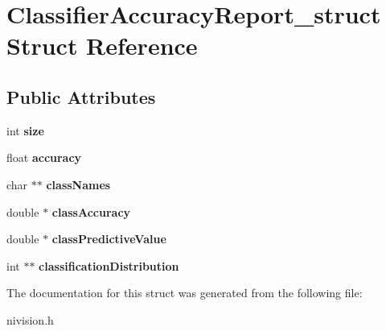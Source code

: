\hypertarget{structClassifierAccuracyReport__struct}{\section{\-Classifier\-Accuracy\-Report\-\_\-struct \-Struct \-Reference}
\label{structClassifierAccuracyReport__struct}
}
\subsection*{\-Public \-Attributes}
\begin{DoxyCompactItemize}
\item 
\hypertarget{structClassifierAccuracyReport__struct_a5fb569c3962e436aa92b4c1ab1802b85}{int {\bfseries size}}\label{structClassifierAccuracyReport__struct_a5fb569c3962e436aa92b4c1ab1802b85}

\item 
\hypertarget{structClassifierAccuracyReport__struct_a25ae18f9939f7115a3054f15f2563577}{float {\bfseries accuracy}}\label{structClassifierAccuracyReport__struct_a25ae18f9939f7115a3054f15f2563577}

\item 
\hypertarget{structClassifierAccuracyReport__struct_a2de244f95be98000b9c4f919017726ba}{char $\ast$$\ast$ {\bfseries class\-Names}}\label{structClassifierAccuracyReport__struct_a2de244f95be98000b9c4f919017726ba}

\item 
\hypertarget{structClassifierAccuracyReport__struct_a1fd960c57dcdc9377f1abd0f407d3f6d}{double $\ast$ {\bfseries class\-Accuracy}}\label{structClassifierAccuracyReport__struct_a1fd960c57dcdc9377f1abd0f407d3f6d}

\item 
\hypertarget{structClassifierAccuracyReport__struct_a255828bd7b7bf3c8b86af7af8f4e9c7b}{double $\ast$ {\bfseries class\-Predictive\-Value}}\label{structClassifierAccuracyReport__struct_a255828bd7b7bf3c8b86af7af8f4e9c7b}

\item 
\hypertarget{structClassifierAccuracyReport__struct_abbdee4f3b993ce992c6bbf0b026c7874}{int $\ast$$\ast$ {\bfseries classification\-Distribution}}\label{structClassifierAccuracyReport__struct_abbdee4f3b993ce992c6bbf0b026c7874}

\end{DoxyCompactItemize}


\-The documentation for this struct was generated from the following file\-:\begin{DoxyCompactItemize}
\item 
nivision.\-h\end{DoxyCompactItemize}
